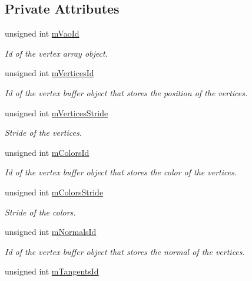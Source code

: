 \subsection*{Private Attributes}
\begin{DoxyCompactItemize}
\item 
unsigned int \hyperlink{class_g_p_u_geometry_a23f035d901894a6a856f907f273787e6}{m\+Vao\+Id}
\begin{DoxyCompactList}\small\item\em Id of the vertex array object. \end{DoxyCompactList}\item 
unsigned int \hyperlink{class_g_p_u_geometry_aec622b7cb70bdcbbe9fd124313caa4ba}{m\+Vertices\+Id}
\begin{DoxyCompactList}\small\item\em Id of the vertex buffer object that stores the position of the vertices. \end{DoxyCompactList}\item 
unsigned int \hyperlink{class_g_p_u_geometry_a50f85b6aad31e8d9a5401c6030fbf7da}{m\+Vertices\+Stride}
\begin{DoxyCompactList}\small\item\em Stride of the vertices. \end{DoxyCompactList}\item 
unsigned int \hyperlink{class_g_p_u_geometry_af547189a739cd2eba9c525bffc191d90}{m\+Colors\+Id}
\begin{DoxyCompactList}\small\item\em Id of the vertex buffer object that stores the color of the vertices. \end{DoxyCompactList}\item 
unsigned int \hyperlink{class_g_p_u_geometry_a1a53ddf5e03d98e274e55e463b8bedb2}{m\+Colors\+Stride}
\begin{DoxyCompactList}\small\item\em Stride of the colors. \end{DoxyCompactList}\item 
unsigned int \hyperlink{class_g_p_u_geometry_a90eb49a3475a9ee00e5efc8d3bb9d2f2}{m\+Normals\+Id}
\begin{DoxyCompactList}\small\item\em Id of the vertex buffer object that stores the normal of the vertices. \end{DoxyCompactList}\item 
unsigned int \hyperlink{class_g_p_u_geometry_a73691872b73594e9adee41c5437e70bf}{m\+Tangents\+Id}

\end{DoxyCompactItemize}
